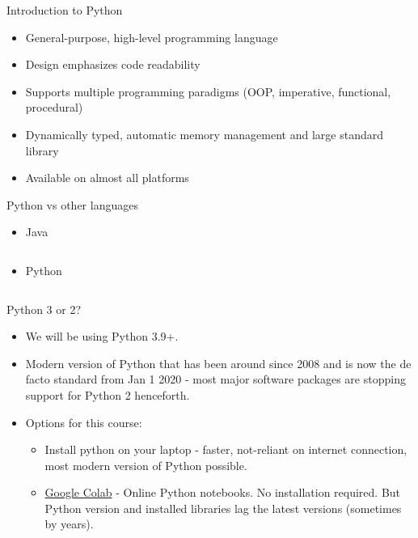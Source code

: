 \documentclass[aspectratio=169]{beamer}
\begin{document}
    \begin{frame}{Introduction to Python}
        \begin{itemize}
            \item General-purpose, high-level programming language
            \item Design emphasizes code readability
            \item Supports multiple programming paradigms (OOP, imperative, functional, procedural)
            \item Dynamically typed, automatic memory management and large standard library
            \item Available on almost all platforms
        \end{itemize}

    \end{frame}


    \begin{frame}[fragile]{Python vs other languages}
        \begin{itemize}
            \item Java
            \inputminted{java}{example_hello_world_java.java}
            \item Python
            \inputminted{python}{example_hello_world_python.py}
        \end{itemize}
    \end{frame}

    \begin{frame}{Python 3 or 2?}
        \begin{itemize}
            \item We will be using Python 3.9+.
            \item Modern version of Python that has been around since 2008 and is now the de facto standard from Jan 1 2020 - most major software packages are stopping support for Python 2 henceforth.
            \item Options for this course:
            \begin{itemize}
                \item Install python on your laptop - faster, not-reliant on internet connection, most modern version of Python possible.
                \item \href{https://colab.research.google.com/}{Google Colab} - Online Python notebooks. No installation required. But Python version and installed libraries lag the latest versions (sometimes by years).
            \end{itemize}
        \end{itemize}
    \end{frame}
\end{document}
